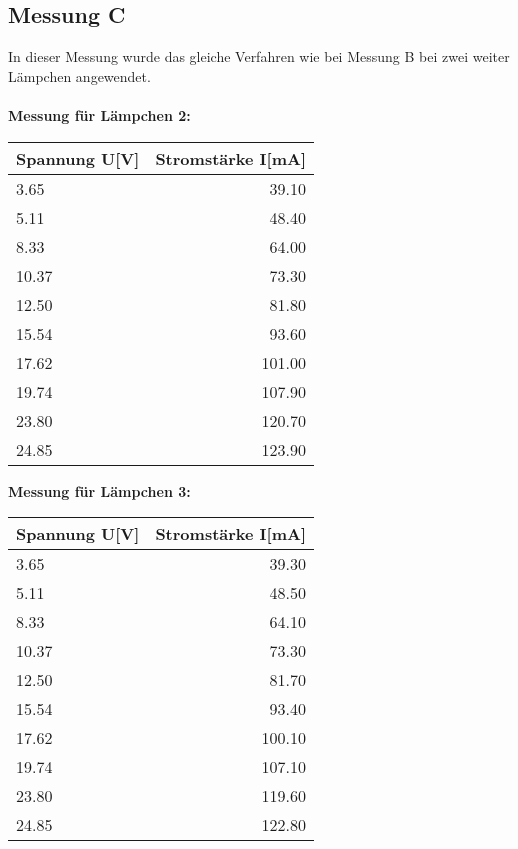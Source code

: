 \documentclass[12pt, a4paper, twoside]{article}
\begin{document}
    \subsection{Messung C}
    In dieser Messung wurde das gleiche Verfahren wie bei Messung B bei zwei weiter Lämpchen angewendet.\\\\
    \textbf{Messung für Lämpchen 2:}\\
    \begin{center}
        \begin{tabular}{l|r}
            \textbf{Spannung U[V]} & \textbf{Stromstärke I[mA]}\\
            \hline
            3.65 & 39.10\\
            5.11 & 48.40\\
            8.33 & 64.00\\
            10.37 & 73.30\\
            12.50 & 81.80\\
            15.54 & 93.60\\
            17.62 & 101.00\\
            19.74 & 107.90\\
            23.80 & 120.70\\
            24.85 & 123.90
        \end{tabular}
    \end{center}
    \vspace{1cm}
    \textbf{Messung für Lämpchen 3:}\\
    \begin{center}
        \begin{tabular}{l|r}
            \textbf{Spannung U[V]} & \textbf{Stromstärke I[mA]}\\
            \hline
            3.65 & 39.30\\
            5.11 & 48.50\\
            8.33 & 64.10\\
            10.37 & 73.30\\
            12.50 & 81.70\\
            15.54 & 93.40\\
            17.62 & 100.10\\
            19.74 & 107.10\\
            23.80 & 119.60\\
            24.85 & 122.80
        \end{tabular}
    \end{center}
\end{document}
